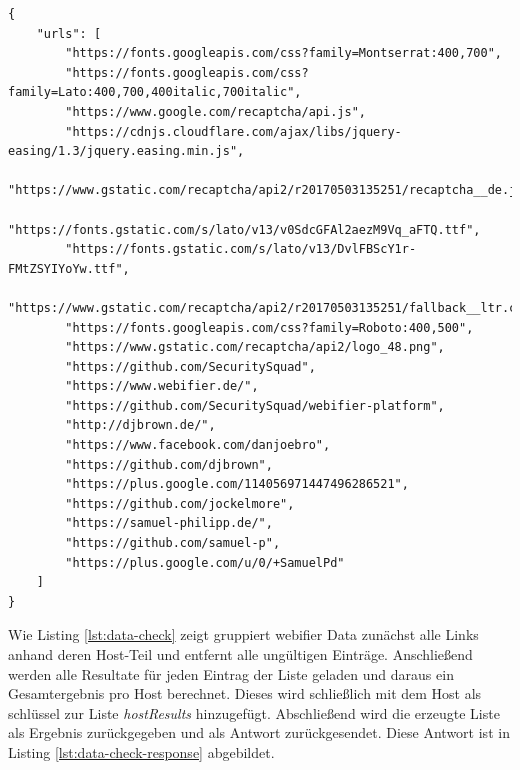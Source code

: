 \begin{scriptsize}
\begin{lstlisting}
{
    "urls": [
        "https://fonts.googleapis.com/css?family=Montserrat:400,700",
        "https://fonts.googleapis.com/css?family=Lato:400,700,400italic,700italic",
        "https://www.google.com/recaptcha/api.js",
        "https://cdnjs.cloudflare.com/ajax/libs/jquery-easing/1.3/jquery.easing.min.js",
        "https://www.gstatic.com/recaptcha/api2/r20170503135251/recaptcha__de.js",
        "https://fonts.gstatic.com/s/lato/v13/v0SdcGFAl2aezM9Vq_aFTQ.ttf",
        "https://fonts.gstatic.com/s/lato/v13/DvlFBScY1r-FMtZSYIYoYw.ttf",
        "https://www.gstatic.com/recaptcha/api2/r20170503135251/fallback__ltr.css",
        "https://fonts.googleapis.com/css?family=Roboto:400,500",
        "https://www.gstatic.com/recaptcha/api2/logo_48.png",
        "https://github.com/SecuritySquad",
        "https://www.webifier.de/",
        "https://github.com/SecuritySquad/webifier-platform",
        "http://djbrown.de/",
        "https://www.facebook.com/danjoebro",
        "https://github.com/djbrown",
        "https://plus.google.com/114056971447496286521",
        "https://github.com/jockelmore",
        "https://samuel-philipp.de/",
        "https://github.com/samuel-p",
        "https://plus.google.com/u/0/+SamuelPd"
    ]
}
\end{lstlisting}
\end{scriptsize}

Wie Listing \ref{lst:data-check} zeigt gruppiert webifier Data zunächst alle Links anhand deren Host-Teil und entfernt alle ungültigen Einträge. Anschließend werden alle Resultate für jeden Eintrag der Liste geladen und daraus ein Gesamtergebnis pro Host berechnet. Dieses wird schließlich mit dem Host als schlüssel zur Liste \textit{hostResults} hinzugefügt. Abschließend wird die erzeugte Liste als Ergebnis zurückgegeben und als Antwort zurückgesendet. Diese Antwort ist in Listing \ref{lst:data-check-response} abgebildet.

